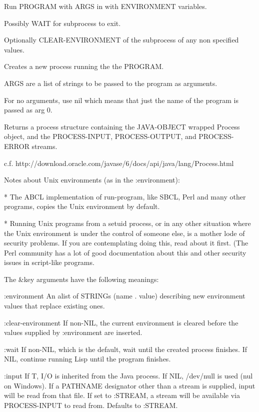 \begin{adjustwidth}{5em}{5em}
Run PROGRAM with ARGS in with ENVIRONMENT variables.

Possibly WAIT for subprocess to exit.

Optionally CLEAR-ENVIRONMENT of the subprocess of any non specified values.

Creates a new process running the the PROGRAM.

ARGS are a list of strings to be passed to the program as arguments. 

For no arguments, use nil which means that just the name of the
program is passed as arg 0.

Returns a process structure containing the JAVA-OBJECT wrapped Process
object, and the PROCESS-INPUT, PROCESS-OUTPUT, and PROCESS-ERROR streams.

c.f. http://download.oracle.com/javase/6/docs/api/java/lang/Process.html

Notes about Unix environments (as in the :environment):

    * The ABCL implementation of run-program, like SBCL, Perl and many
      other programs, copies the Unix environment by default.

    * Running Unix programs from a setuid process, or in any other
      situation where the Unix environment is under the control of
      someone else, is a mother lode of security problems. If you are
      contemplating doing this, read about it first. (The Perl
      community has a lot of good documentation about this and other
      security issues in script-like programs.

The \&key arguments have the following meanings:

:environment 
    An alist of STRINGs (name . value) describing new
    environment values that replace existing ones.

:clear-environment
    If non-NIL, the current environment is cleared before the
    values supplied by :environment are inserted.

:wait 
    If non-NIL, which is the default, wait until the created process
    finishes. If NIL, continue running Lisp until the program
    finishes.

:input
    If T, I/O is inherited from the Java process. If NIL, /dev/null is used
    (nul on Windows). If a PATHNAME designator other than a stream is
    supplied, input will be read from that file. If set to :STREAM, a stream
    will be available via PROCESS-INPUT to read from. Defaults to :STREAM.


\end{adjustwidth}
